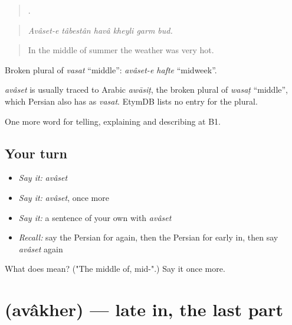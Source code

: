 \begin{quote}
     .
\end{quote}

\begin{quote}
\emph{Avâset-e tâbestân havâ kheyli garm bud.}
\end{quote}

\begin{quote}
In the middle of summer the weather was very hot.
\end{quote}

Broken plural of \emph{vasat} \textquotedblleft{}middle\textquotedblright{}: \emph{avâset-e hafte} \textquotedblleft{}midweek\textquotedblright{}.

\begin{cousinweb}
\emph{avâset} is usually traced to Arabic \emph{awāsiṭ}, the broken plural of \emph{wasaṭ} \textquotedblleft{}middle\textquotedblright{}, which Persian also has as \emph{vasat}. EtymDB lists no entry for the plural.
\end{cousinweb}

\begin{grammarlens}[title={What you've built}]
One more word for telling, explaining and describing at B1.
\end{grammarlens}

\subsection*{Your turn}
\begin{itemize}
\raggedright
  \item \emph{Say it:} \emph{avâset}
  \item \emph{Say it:} \emph{avâset}, once more
  \item \emph{Say it:} a sentence of your own with \emph{avâset}
  \item \emph{Recall:} say the Persian for again, then the Persian for early in, then say \emph{avâset} again
\end{itemize}

\begin{tcolorbox}[breakable,colback=teal!4,colframe=teal!35!black,title={Before you move on}]
What does  mean? ("The middle of, mid-".) Say it once more.
\end{tcolorbox}
\section[\texorpdfstring{\fa{اواخر} (avâkher)}{اواخر (avâkher)}]{ (avâkher) — late in, the last part}

